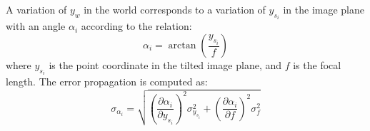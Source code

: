 A variation of $y_w$ in the world corresponds to a variation of $y_{s_i}$ in the image plane with an angle $\alpha_i$ according to the relation:
  \begin{equation}
    \label{app:eq:triang_angle}
  	\alpha_i = \arctan\left( \frac{y_{s_i}}{f} \right)
  \end{equation}
where $y_{s_i}$ is the point coordinate in the tilted image plane, and $f$ is the focal length. The error propagation is computed as:
  \begin{equation}
  	\sigma_{\alpha_i} = \sqrt{
  	  \left( \frac{\partial \alpha_i}{\partial y_{s_i}} \right)^2 \sigma_{y_{s_i}}^2
  	  + \left( \frac{\partial \alpha_i}{\partial f} \right)^2 \sigma_f^2
  	}
    \label{app:eq:sigma-alpha}
  \end{equation} \\

